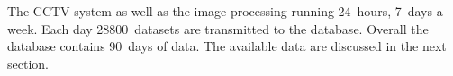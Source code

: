 
The CCTV system as well as the image processing running 24~hours, 7~days a week. Each day 28800~datasets are transmitted to the database. Overall the database contains 90~days of data. The available data are discussed in the next section.